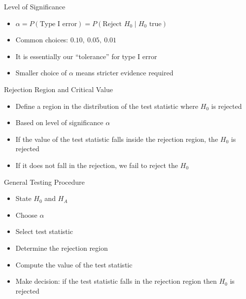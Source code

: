 \documentclass[12pt, aspectratio=169]{beamer}
\begin{document}
    \begin{frame}{Level of Significance}
        \begin{itemize}
            \item $\alpha = P(\text{Type I error}) = P(\text{Reject } H_0 \mid H_0 \text{ true})$
            \item Common choices: $0.10,\ 0.05,\ 0.01$
            \item It is essentially our ``tolerance'' for type I error
            \item Smaller choice of $\alpha$ means stricter evidence required
        \end{itemize}
    \end{frame}


    \begin{frame}{Rejection Region and Critical Value}
        \begin{itemize}
            \item Define a region in the distribution of the test statistic where $H_0$ is rejected
            \item Based on level of significance $\alpha$
            \item If the value of the test statistic falls inside the rejection region, the \(H_0\) is rejected
            \item If it does not fall in the rejection, we fail to reject the \(H_0\)
        \end{itemize}
    \end{frame}


    \begin{frame}{General Testing Procedure}
        \begin{itemize}
            \item State $H_0$ and $H_A$
            \item Choose $\alpha$
            \item Select test statistic
            \item Determine the rejection region
            \item Compute the value of the test statistic
            \item Make decision: if the test statistic falls in the rejection region then \(H_0\) is rejected
        \end{itemize}
    \end{frame}
\end{document}
